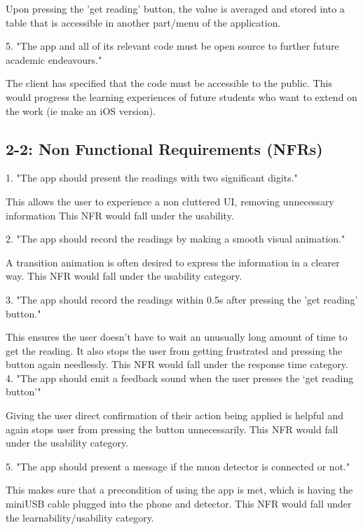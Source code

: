 \documentclass[11pt,a4paper]{article}
\begin{document}
Upon pressing the 'get reading' button, the value is averaged and stored into a table that is accessible in another part/menu of the application.

\vskip 6mm
5. "The app and all of its relevant code must be open source to further future academic endeavours."

The client has specified that the code must be accessible to the public. This would progress the learning experiences of future students who want to extend on the work (ie make an iOS version).  


\subsection*{2-2: Non Functional Requirements (NFRs)}

1. "The app should present the readings with two significant digits."

This allows the user to experience a non cluttered UI, removing unnecessary information This NFR would fall under the usability. 

\vskip 6mm

2. "The app should record the readings by making a smooth visual animation."

A transition animation is often desired to express the information in a clearer way. This NFR would fall under the usability category. 

\vskip 6mm

3. "The app should record the readings within 0.5s after pressing the 'get reading' button."

This ensures the user doesn't have to wait an unusually long amount of time to get the reading. It also stops the user from getting frustrated and pressing the button again needlessly. This NFR would fall under the response time category. 
\vskip 6mm
4. "The app should emit a feedback sound when the user presses the ‘get reading button’" 

Giving the user direct confirmation of their action being applied is helpful and again stops user from pressing the button unnecessarily. This NFR would fall under the usability category.

\vskip 6mm
5. "The app should present a message if the muon detector is connected or not."

This makes sure that a precondition of using the app is met, which is having the miniUSB cable plugged into the phone and detector. This NFR would fall under the learnability/usability category. 
\end{document}
